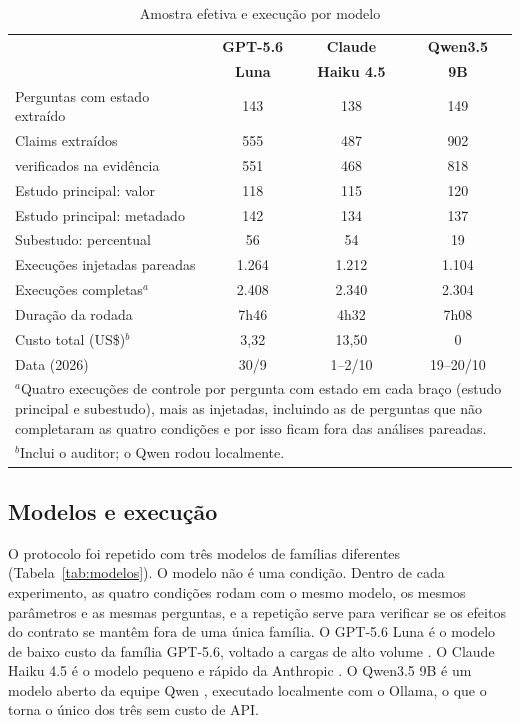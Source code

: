 \begin{table}[htbp]
\caption{Amostra efetiva e execução por modelo}
\label{tab:amostra}
\centering
\footnotesize
\setlength{\tabcolsep}{3pt}
\begin{tabular}{|l|c|c|c|}
\hline
 & \textbf{GPT-5.6} & \textbf{Claude} & \textbf{Qwen3.5} \\
 & \textbf{Luna} & \textbf{Haiku 4.5} & \textbf{9B} \\
\hline
Perguntas com estado extraído & 143 & 138 & 149 \\
Claims extraídos & 555 & 487 & 902 \\
\quad verificados na evidência & 551 & 468 & 818 \\
\hline
Estudo principal: valor & 118 & 115 & 120 \\
Estudo principal: metadado & 142 & 134 & 137 \\
Subestudo: percentual & 56 & 54 & 19 \\
\hline
Execuções injetadas pareadas & 1.264 & 1.212 & 1.104 \\
\hline
Execuções completas$^{a}$ & 2.408 & 2.340 & 2.304 \\
Duração da rodada & 7h46 & 4h32 & 7h08 \\
Custo total (US\$)$^{b}$ & 3,32 & 13,50 & 0 \\
Data (2026) & 30/9 & 1--2/10 & 19--20/10 \\
\hline
\multicolumn{4}{p{0.92\columnwidth}}{\scriptsize $^{a}$Quatro execuções de controle por pergunta com estado em cada braço (estudo principal e subestudo), mais as injetadas, incluindo as de perguntas que não completaram as quatro condições e por isso ficam fora das análises pareadas.} \\
\multicolumn{4}{l}{\scriptsize $^{b}$Inclui o auditor; o Qwen rodou localmente.} \\
\end{tabular}
\end{table}

\subsection{Modelos e execução}\label{sec:modelos}

O protocolo foi repetido com três modelos de famílias diferentes (Tabela~\ref{tab:modelos}).
O modelo não é uma condição. Dentro de cada experimento, as quatro condições rodam com o mesmo modelo, os mesmos parâmetros e as mesmas perguntas, e a repetição serve para verificar se os efeitos do contrato se mantêm fora de uma única família.
O GPT-5.6 Luna é o modelo de baixo custo da família GPT-5.6, voltado a cargas de alto volume \cite{openai2026luna}.
O Claude Haiku 4.5 é o modelo pequeno e rápido da Anthropic \cite{anthropic2025haiku}.
O Qwen3.5 9B é um modelo aberto da equipe Qwen \cite{qwen2026qwen35}, executado localmente com o Ollama, o que o torna o único dos três sem custo de API.

